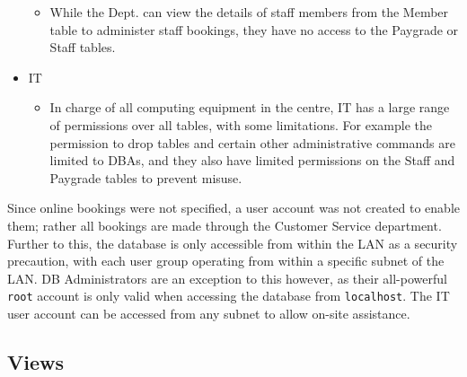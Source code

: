 \documentclass[a4paper, titlepage]{article}
\begin{document}
\begin{itemize}
\begin{itemize}
		\item While the Dept. can view the details of staff members from the Member table to administer staff bookings, they have no access to the Paygrade or Staff tables.
	\end{itemize}
	\item IT
	\begin{itemize}
		\item In charge of all computing equipment in the centre, IT has a large range of permissions over all tables, with some limitations. For example the permission to drop tables and certain other administrative commands are limited to DBAs, and they also have limited permissions on the Staff and Paygrade tables to prevent misuse.
	\end{itemize}
\end{itemize}
Since online bookings were not specified, a user account was not created to enable them; rather all bookings are made through the Customer Service department. Further to this, the database is only accessible from within the LAN as a security precaution, with each user group operating from within a specific subnet of the LAN. DB Administrators are an exception to this however, as their all-powerful \texttt{root} account is only valid when accessing the database from \texttt{localhost}. The IT user account can be accessed from any subnet to allow on-site assistance.

\subsection{Views}
\end{document}
